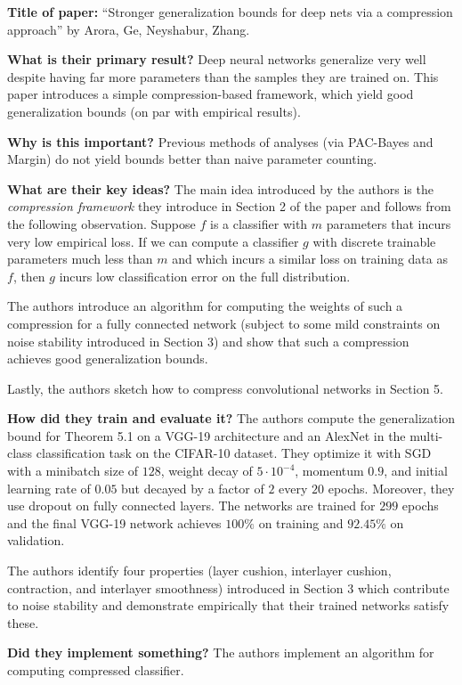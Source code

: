 \noindent \textbf{Title of paper:} ``Stronger generalization bounds for deep
nets via a compression approach'' by Arora, Ge, Neyshabur, Zhang. 

\noindent\textbf{What is their primary result?} Deep neural networks generalize
very well despite having far more parameters than the samples they are trained
on. This paper introduces a simple compression-based framework, which yield good
generalization bounds (on par with empirical results).

\noindent\textbf{Why is this important?} Previous methods of analyses (via
PAC-Bayes and Margin) do not yield bounds better than naive parameter counting. 

\noindent\textbf{What are their key ideas?} The main idea introduced by the
authors is the \emph{compression framework} they introduce in Section 2 of the
paper and follows from the following observation. Suppose $f$ is a classifier
with $m$ parameters that incurs very low empirical loss. If we can compute a
classifier $g$ with discrete trainable parameters much less than $m$ and which
incurs a similar loss on training data as $f$, then $g$ incurs low
classification error on the full distribution.

The authors introduce an algorithm for computing the weights of such a
compression for a fully connected network (subject to some mild constraints on
noise stability introduced in Section 3) and show that such a compression
achieves good generalization bounds.

Lastly, the authors sketch how to compress convolutional networks in Section 5.




\noindent\textbf{How did they train and evaluate it?} The authors compute the
generalization bound for Theorem 5.1 on a VGG-19 architecture and an AlexNet in
the multi-class classification task on the CIFAR-10 dataset. They optimize it
with SGD with a minibatch size of $128$, weight decay of $5\cdot 10^{-4}$,
momentum $0.9$, and initial learning rate of $0.05$ but decayed by a factor of
$2$ every $20$ epochs. Moreover, they use dropout on fully connected layers. The
networks are trained for $299$ epochs and the final VGG-19 network achieves
$100\%$ on training and $92.45\%$ on validation.

The authors identify four properties (layer cushion, interlayer cushion,
contraction, and interlayer smoothness) introduced in Section 3 which contribute
to noise stability and demonstrate empirically that their trained networks
satisfy these.

\noindent\textbf{Did they implement something?} The authors implement an
algorithm for computing compressed classifier. 




